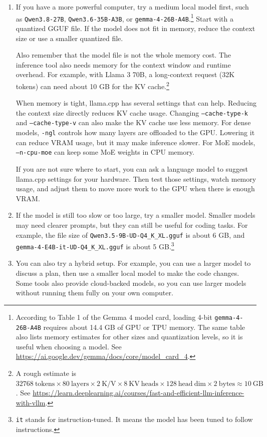 \documentclass[a4paper,12pt]{article}
\begin{document}
\begin{enumerate}
\item If you have a more powerful computer, try a medium local model first, such as \texttt{Qwen3.8-27B}, \texttt{Qwen3.6-35B-A3B}, or \texttt{gemma-4-26B-A4B}.\footnote{According to Table 1 of the Gemma 4 model card, loading 4-bit \texttt{gemma-4-26B-A4B} requires about 14.4 GB of GPU or TPU memory. The same table also lists memory estimates for other sizes and quantization levels, so it is useful when choosing a model. See \url{https://ai.google.dev/gemma/docs/core/model_card_4}.} Start with a quantized GGUF file. If the model does not fit in memory, reduce the context size or use a smaller quantized file.

Also remember that the model file is not the whole memory cost. The inference tool also needs memory for the context window and runtime overhead. For example, with Llama 3 70B, a long-context request (32K tokens) can need about 10 GB for the KV cache.\footnote{A rough estimate is $32768\ \mathrm{tokens}  \times 80\ \mathrm{layers} \times 2\ \mathrm{K/V} \times 8\ \mathrm{KV\ heads} \times 128\ \mathrm{head\ dim} \times 2\ \mathrm{bytes} \approx 10\ \mathrm{GB}$. See \url{https://learn.deeplearning.ai/courses/fast-and-efficient-llm-inference-with-vllm}.}

When memory is tight, llama.cpp has several settings that can help. Reducing the context size directly reduces KV cache usage. Changing \texttt{--cache-type-k} and \texttt{--cache-type-v} can also make the KV cache use less memory. For dense models, \texttt{-ngl} controls how many layers are offloaded to the GPU. Lowering it can reduce VRAM usage, but it may make inference slower. For MoE models, \texttt{--n-cpu-moe} can keep some MoE weights in CPU memory.

If you are not sure where to start, you can ask a language model to suggest llama.cpp settings for your hardware. Then test those settings, watch memory usage, and adjust them to move more work to the GPU when there is enough VRAM.

\item If the model is still too slow or too large, try a smaller model. Smaller models may need clearer prompts, but they can still be useful for coding tasks. For example, the file size of \texttt{Qwen3.5-9B-UD-Q4\_K\_XL.gguf} is about 6 GB, and \texttt{gemma-4-E4B-it-UD-Q4\_K\_XL.gguf} is about 5 GB.\footnote{\texttt{it} stands for instruction-tuned. It means the model has been tuned to follow instructions.}

\item You can also try a hybrid setup. For example, you can use a larger model to discuss a plan, then use a smaller local model to make the code changes. Some tools also provide cloud-backed models, so you can use larger models without running them fully on your own computer.
\end{enumerate}
\end{document}
